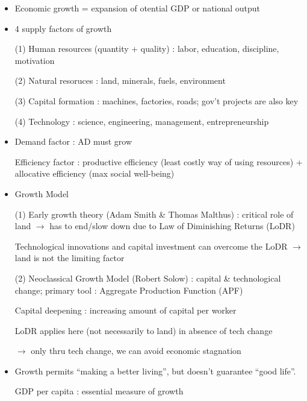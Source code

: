\documentclass{article}
\begin{document}
\newpage
{}
\begin{itemize}
\item Economic growth = expansion of otential GDP or national output

\item 4 supply factors of growth

(1) Human resources (quantity + quality) : labor, education, discipline, motivation

(2) Natural resoruces : land, minerals, fuels, environment

(3) Capital formation : machines, factories, roads; gov't projects are also key

(4) Technology : science, engineering, management, entrepreneurship

\item Demand factor : AD must grow

Efficiency factor : productive efficiency (least costly way of using resources) + allocative efficiency (max social well-being)

\item Growth Model

(1) Early growth theory (Adam Smith \& Thomas Malthus) : critical role of land $\rightarrow$ has to end/slow down due to Law of Diminishing Returns (LoDR)

Technological innovations and capital investment can overcome the LoDR $\rightarrow$ land is not the limiting factor

(2) Neoclassical Growth Model (Robert Solow) : capital \& technological change; primary tool : Aggregate Production Function (APF)

Capital deepening : increasing amount of capital per worker

LoDR applies here (not necessarily to land) in absence of tech change

$\rightarrow$ only thru tech change, we can avoid economic stagnation

\item Growth permits ``making a better living'', but doesn't guarantee ``good life''.

GDP per capita : essential measure of growth

\end{itemize}
\end{document}
